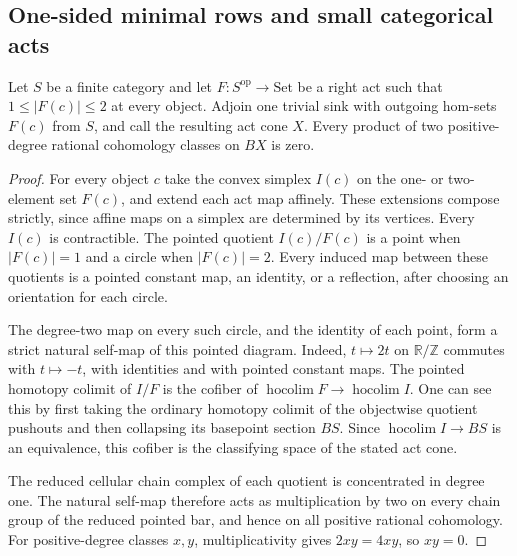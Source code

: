 \subsection{One-sided minimal rows and small categorical acts}

\begin{lemma}
\label{C:two-states-objectwise-act-cups}
Let $S$ be a finite category and let
$F:S^{\mathrm{op}}\to\mathrm{Set}$ be a right act such that
$1\leq |F(c)|\leq2$ at every object. Adjoin one trivial sink
with outgoing hom-sets $F(c)$ from $S$, and call the resulting
act cone $X$. Every product of two positive-degree rational
cohomology classes on $BX$ is zero.
\end{lemma}
\begin{proof}
For every object $c$ take the convex simplex $I(c)$ on the
one- or two-element set $F(c)$, and extend each act map affinely.
These extensions compose strictly, since affine maps on a simplex
are determined by its vertices. Every $I(c)$ is contractible.
The pointed quotient $I(c)/F(c)$ is a point when $|F(c)|=1$
and a circle when $|F(c)|=2$. Every induced map between these
quotients is a pointed constant map, an identity, or a reflection,
after choosing an orientation for each circle.

The degree-two map on every such circle, and the identity of
each point, form a strict natural self-map of this pointed
diagram. Indeed, $t\mapsto2t$ on $\mathbb R/\mathbb Z$
commutes with $t\mapsto-t$, with identities and with pointed
constant maps. The pointed homotopy colimit of $I/F$ is the
cofiber of $\operatorname{hocolim}F\to\operatorname{hocolim}I$.
One can see this by first taking the ordinary homotopy colimit
of the objectwise quotient pushouts and then collapsing its
basepoint section $BS$. Since
$\operatorname{hocolim}I\to BS$ is an equivalence, this cofiber
is the classifying space of the stated act cone.

The reduced cellular chain complex of each quotient is
concentrated in degree one. The natural self-map therefore acts
as multiplication by two on every chain group of the reduced
pointed bar, and hence on all positive rational cohomology.
For positive-degree classes $x,y$, multiplicativity gives
$2xy=4xy$, so $xy=0$.
\end{proof}


